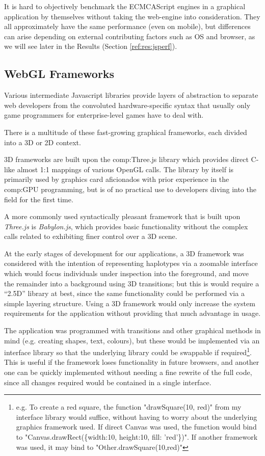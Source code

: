 It is hard to objectively benchmark the ECMCAScript engines in a graphical application by themselves without taking the web-engine into consideration. They all approximately have the same performance (even on mobile)\cite{charland2011mobile}, but differences can arise depending on external contributing factors such as OS and browser, as we will see later in the Results (Section \ref{ref:res:jsperf}).


\subsection{WebGL Frameworks}

Various intermediate Javascript libraries provide layers of abstraction to separate web developers from the convoluted hardware-specific syntax that usually only game programmers for enterprise-level games have to deal with.

There is a multitude of these fast-growing graphical frameworks, each divided into a 3D or 2D context. 

3D frameworks are built upon the \gls{comp:Three.js} library which provides direct C-like almost 1:1 mappings of various OpenGL calls. The library by itself is primarily used by graphics card aficionados with prior experience in the \gls{comp:GPU} programming, but is of no practical use to developers diving into the field for the first time. 

A more commonly used syntactically pleasant framework that is built upon \textit{Three.js} is \textit{Babylon.js}, which provides basic functionality without the complex calls related to exhibiting finer control over a 3D scene.

At the early stages of development for our applications, a 3D framework was considered  with the intention of representing haplotypes via a zoomable interface which would focus individuals under inspection into the foreground, and move the remainder into a background using 3D transitions; but this is would require a “2.5D” library at best, since the same functionality could be performed via a simple layering structure. Using a 3D framework would only increase the system requirements for the application without providing that much advantage in usage.

The application was programmed with transitions and other graphical methods in mind (e.g. creating shapes, text, colours), but these would be implemented via an interface library so that the underlying library could be swappable if required\footnote{e.g. To create a red square, the function "drawSquare(10, red)" from my interface library would suffice, without having to worry about the underlying graphics framework used. If direct Canvas was used, the function would bind to "Canvas.drawRect(\{width:10, height:10, fill: 'red'\})". If another framework was used, it may bind to "Other.drawSquare(10,red)"}. This is useful if the framework loses functionality in future browsers, and another one can be quickly implemented without needing a fine rewrite of the full code, since all changes required would be contained in a single interface.

